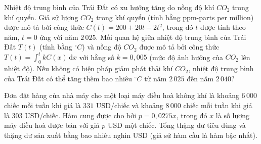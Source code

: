 \begin{bt}%
	Nhiệt độ trung bình của Trái Đất có xu hướng tăng do nồng độ khí $CO_2$  trong khí quyển. Giả sử lượng $CO_2$ trong khí quyển (tính bằng ppm-parts per million) được mô tả bởi công thức $C(t)=200+20t-2t^2$, trong đó $t$ được tính theo năm, $t=0$ ứng với năm $2\,025$.
	Mối quan hệ giữa nhiệt độ trung bình của Trái Đất $T(t)$ (tính bằng $^\circ C$) và nồng độ $CO_2$ được mô tả bởi công thức $T(t)=\displaystyle\int_0^t kC(x)\mathrm{\,d}x$ với hằng số $k=0{,}005$ (mức độ ảnh hưởng của $CO_2$ lên nhiệt độ). Nếu không có biện pháp giảm phát thải khí $CO_2$, nhiệt độ trung bình của  Trái Đất có thể tăng thêm bao nhiêu $^\circ C$ từ năm $2\,025$ đến năm $2\,040$?
\end{bt}

\begin{bt}%
	Đơn đặt hàng của nhà máy cho một loại máy điều hoà không khí là khoảng $6\,000$ chiếc mỗi tuần khi giá là  $331$ USD/chiếc và khoảng $8\,000$ chiếc mỗi tuần khi giá là $303$ USD/chiếc. Hàm cung được cho bởi $p=0{,}0275x$, trong đó $x$ là số lượng máy điều hoà được bán với giá $p$ USD một chiếc. Tổng thặng dư tiêu dùng và thặng dư sản xuất bằng bao nhiêu nghìn USD (giả sử hàm cầu là hàm bậc nhất).
\end{bt}

